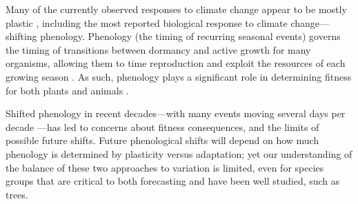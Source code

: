 \documentclass{article}
\begin{document}

Many of the currently observed responses to climate change appear to be mostly plastic \citep{burton22,zettle21,bonamour19, king17}, including the most reported biological response to climate change---shifting phenology. Phenology (the timing of recurring seasonal events) governs the timing of transitions between dormancy and active growth for many organisms, allowing them to time reproduction and exploit the resources of each growing season \citep{chuine10,hanninen11,rytteri21,posle18}. As such, phenology plays a significant role in determining fitness for both plants \citep{guo22,chuine01} and animals \citep{wann19,renner18,chu17}. 

Shifted phenology in recent decades---with many events moving several days per decade \citep{vita21,khar18,Menzel06}---has led to concerns about fitness consequences, and the limits of possible future shifts. Future phenological shifts will depend on how much phenology is determined by plasticity versus adaptation; yet our understanding of the balance of these two approaches to variation is limited, even for species groups that are critical to both forecasting and have been well studied, such as trees. 
\end{document}
